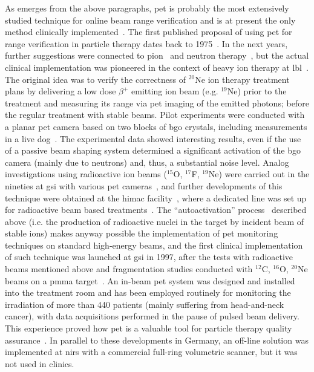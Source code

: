 As emerges from the above paragraphs, \gls{pet} is probably the most extensively studied technique for online beam range verification and is at present the only method clinically implemented~\parencite{Yamaya2018}. The first published proposal of using \gls{pet} for range verification in particle therapy dates back to 1975~\parencite{Bennett1975}. In the next years, further suggestions were connected to pion~\parencite{Goodman1986, Shirato1989} and neutron therapy~\parencite{Vynckier1989}, but the actual clinical implementation was pioneered in the context of heavy ion therapy at \gls{lbl}~\parencite{Llacer1979, Chatterjee1981}. The original idea was to verify the correctness of $^{20}$Ne ion therapy treatment plans by delivering a low dose $\beta^+$ emitting ion beam (e.g. $^{19}$Ne) prior to the treatment and measuring its range via \gls{pet} imaging of the emitted photons; before the regular treatment with stable beams. Pilot experiments were conducted with a planar \gls{pet} camera based on two blocks of \gls{bgo} crystals, including measurements in a live dog~\parencite{Llacer1984b}. The experimental data showed interesting results, even if the use of a passive beam shaping system determined a significant activation of the \gls{bgo} camera (mainly due to neutrons) and, thus, a substantial noise level. Analog investigations using radioactive ion beams ($^{15}$O, $^{17}$F, $^{19}$Ne) were carried out in the nineties at \gls{gsi} with various \gls{pet} cameras~\parencite{Pawelke1996}, and further developments of this technique were obtained at the \gls{himac} facility~\parencite{Iseki2004, Kitagawa2006}, where a dedicated line was set up for radioactive beam based treatments~\parencite{Urakabe2001, Kanazawa2002}. The \enquote{autoactivation} process~\parencite{Tobias1971} described above (i.e. the production of radioactive nuclei in the target by incident beam of stable ions) makes anyway possible the implementation of \gls{pet} monitoring techniques on standard high-energy beams, and the first clinical implementation of such  technique was launched at \gls{gsi} in 1997, after the tests with radioactive beams mentioned above and fragmentation studies conducted with $^{12}$C, $^{16}$O, $^{20}$Ne beams on a \gls{pmma} target~\parencite{Enghardt1992}. An in-beam \gls{pet} system was designed and installed into the treatment room and has been employed routinely for monitoring the irradiation of more than 440 patients (mainly suffering from head-and-neck cancer), with data acquisitions performed in the pause of pulsed beam delivery. This experience proved how \gls{pet} is a valuable tool for particle therapy quality assurance~\parencite{Enghardt2004}. In parallel to these developments in Germany, an off-line solution was implemented at \gls{nirs} with a commercial full-ring volumetric scanner, but it was not used in clinics. 

